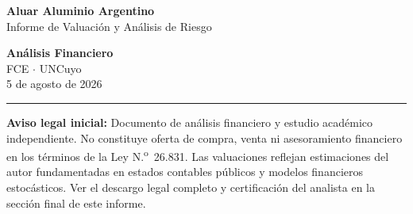 \documentclass[10pt,a4paper]{article}
\begin{document}
\renewcommand{\topfraction}{0.95}
\renewcommand{\bottomfraction}{0.95}
\renewcommand{\floatpagefraction}{0.85}
\renewcommand{\textfraction}{0.05}


\noindent
\begin{minipage}[b]{0.65\textwidth}
    {\fontsize{22}{26}\selectfont \color{gsnavy} \textbf{Aluar Aluminio Argentino}} \\[0.15cm]
    {\large \color{gsgray} \textsf{Informe de Valuación y Análisis de Riesgo}}
\end{minipage}%
\begin{minipage}[b]{0.35\textwidth}
    \raggedleft
    {\small \color{gsgray} \textbf{Análisis Financiero}} \\
    {\small \color{gsgray} FCE $\cdot$ UNCuyo} \\
    {\small \color{gsgray} 5 de agosto de 2026}
\end{minipage}

\vspace{0.15cm}
\noindent\textcolor{gsnavy}{\rule{\textwidth}{1.2pt}}
\vspace{0.08cm}

\noindent
{\scriptsize \color{gsgray} \textbf{Aviso legal inicial:} Documento de análisis financiero y estudio académico independiente. No constituye oferta de compra, venta ni asesoramiento financiero en los términos de la Ley N.\textsuperscript{o}~26.831. Las valuaciones reflejan estimaciones del autor fundamentadas en estados contables públicos y modelos financieros estocásticos. Ver el descargo legal completo y certificación del analista en la sección final de este informe.}

\vspace{0.15cm}
\end{document}
